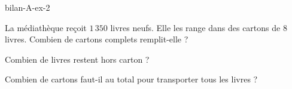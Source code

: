 \begin{blocEdition}{bilan-A-ex-2}
\begin{questions}
\item La médiathèque reçoit $1\,350$ livres neufs. Elle les range dans des cartons de 8 livres. Combien de cartons complets remplit-elle ?
\item Combien de livres restent hors carton ?
\item Combien de cartons faut-il au total pour transporter tous les livres ?
\end{questions}\par{}\par\par{}\par{}\par{}\par{}\par{}\par{}
\end{blocEdition}
